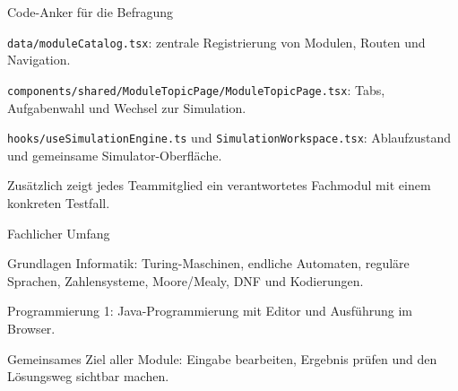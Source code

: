 \begin{itemframe}{Code-Anker für die Befragung}
  \item \texttt{data/moduleCatalog.tsx}: zentrale Registrierung von Modulen, Routen und Navigation.
  \item \texttt{components/shared/ModuleTopicPage/ModuleTopicPage.tsx}: Tabs, Aufgabenwahl und Wechsel zur Simulation.
  \item \texttt{hooks/useSimulationEngine.ts} und \texttt{SimulationWorkspace.tsx}: Ablaufzustand und gemeinsame Simulator-Oberfläche.
  \item Zusätzlich zeigt jedes Teammitglied ein verantwortetes Fachmodul mit einem konkreten Testfall.
\end{itemframe}

\begin{itemframe}{Fachlicher Umfang}
  \item Grundlagen Informatik: Turing-Maschinen, endliche Automaten, reguläre Sprachen, Zahlensysteme, Moore/Mealy, DNF und Kodierungen.
  \item Programmierung 1: Java-Programmierung mit Editor und Ausführung im Browser.
  \item Gemeinsames Ziel aller Module: Eingabe bearbeiten, Ergebnis prüfen und den Lösungsweg sichtbar machen.
\end{itemframe}
